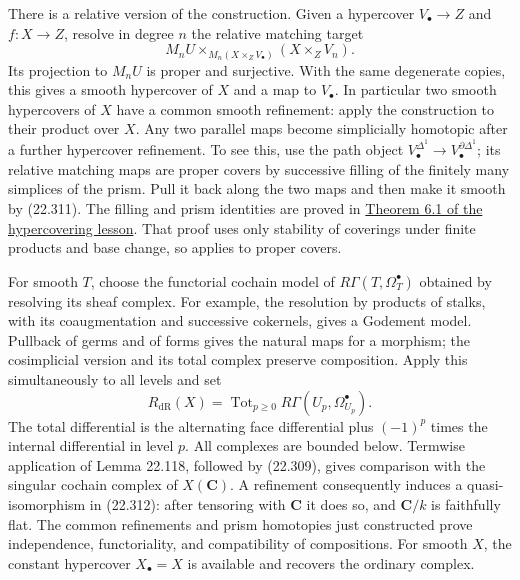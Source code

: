 \documentclass[
  11pt,
  a4paper,
]{article}
\begin{document}
There is a relative version of the construction. Given a hypercover
\(V_\bullet\to Z\) and \(f:X\to Z\), resolve in degree \(n\) the
relative matching target \[
 M_nU\times_{M_n(X\times_ZV_\bullet)}
                         (X\times_ZV_n).
 \tag{22.311}
\] Its projection to \(M_nU\) is proper and surjective. With the same
degenerate copies, this gives a smooth hypercover of \(X\) and a map to
\(V_\bullet\). In particular two smooth hypercovers of \(X\) have a
common smooth refinement: apply the construction to their product over
\(X\). Any two parallel maps become simplicially homotopic after a
further hypercover refinement. To see this, use the path object
\(V_\bullet^{\Delta^1}\to
V_\bullet^{\partial\Delta^1}\); its relative matching maps are proper
covers by successive filling of the finitely many simplices of the
prism. Pull it back along the two maps and then make it smooth by
(22.311). The filling and prism identities are proved in
\href{https://kokunoyumeto.github.io/open-math-courses-public/courses/ag-etale-cohomology/hypercoverings.html\#6-maps-become-homotopic-after-refinement}{Theorem
6.1 of the hypercovering lesson}. That proof uses only stability of
coverings under finite products and base change, so applies to proper
covers.

For smooth \(T\), choose the functorial cochain model of
\(R\Gamma(T,\Omega^\bullet_T)\) obtained by resolving its sheaf complex.
For example, the resolution by products of stalks, with its
coaugmentation and successive cokernels, gives a Godement model.
Pullback of germs and of forms gives the natural maps for a morphism;
the cosimplicial version and its total complex preserve composition.
Apply this simultaneously to all levels and set \[
 R_{\mathrm{dR}}(X)
   =\operatorname{Tot}_{p\ge0}
                R\Gamma(U_p,\Omega^\bullet_{U_p}).
 \tag{22.312}
\] The total differential is the alternating face differential plus
\((-1)^p\) times the internal differential in level \(p\). All complexes
are bounded below. Termwise application of Lemma 22.118, followed by
(22.309), gives comparison with the singular cochain complex of
\(X(\mathbf C)\). A refinement consequently induces a quasi-isomorphism
in (22.312): after tensoring with \(\mathbf C\) it does so, and
\(\mathbf C/k\) is faithfully flat. The common refinements and prism
homotopies just constructed prove independence, functoriality, and
compatibility of compositions. For smooth \(X\), the constant hypercover
\(X_\bullet=X\) is available and recovers the ordinary complex.
\end{document}
